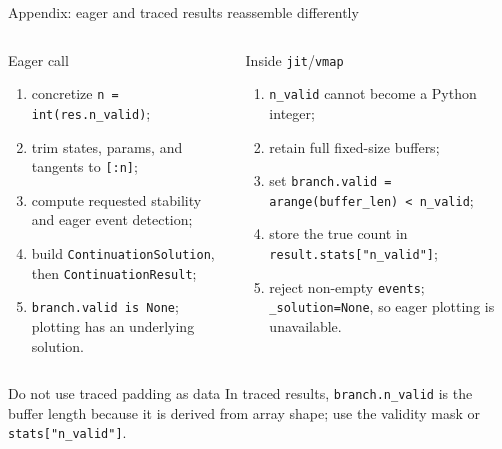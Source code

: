 \begin{frame}{Appendix: eager and traced results reassemble differently}
\scriptsize
\begin{columns}[T,onlytextwidth]
\begin{block}{Eager call}
\begin{enumerate}
  \item concretize \texttt{n = int(res.n\_valid)};
  \item trim states, params, and tangents to \texttt{[:n]};
  \item compute requested stability and eager event detection;
  \item build \texttt{ContinuationSolution}, then \texttt{ContinuationResult};
  \item \texttt{branch.valid is None}; plotting has an underlying solution.
\end{enumerate}
\end{block}
\begin{block}{Inside \texttt{jit}/\texttt{vmap}}
\begin{enumerate}
  \item \texttt{n\_valid} cannot become a Python integer;
  \item retain full fixed-size buffers;
  \item set \texttt{branch.valid = arange(buffer\_len) < n\_valid};
  \item store the true count in \texttt{result.stats["n\_valid"]};
  \item reject non-empty \texttt{events}; \texttt{\_solution=None}, so eager plotting is unavailable.
\end{enumerate}
\end{block}
\end{columns}

\begin{alertblock}{Do not use traced padding as data}
In traced results, \texttt{branch.n\_valid} is the buffer length because it is
derived from array shape; use the validity mask or \texttt{stats["n\_valid"]}.
\end{alertblock}
\end{frame}

